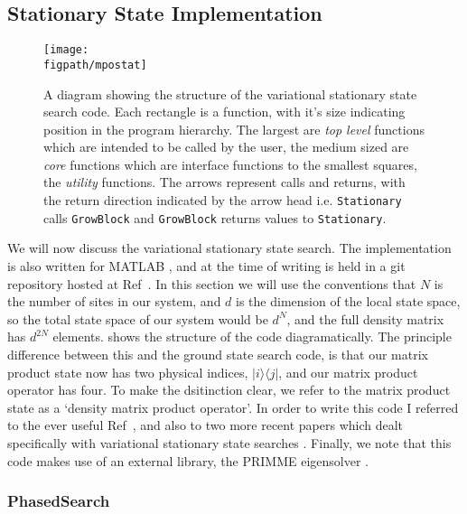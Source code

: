 \FloatBarrier 
 
 \subsection{Stationary State Implementation}
 
 \begin{figure}[ht!]
 \centering
 \texttt{[image: \\figpath/mpostat]}
 \caption{A diagram showing the structure of the variational stationary state search code. Each rectangle is a function, with it's size indicating position in the program hierarchy. The largest are \emph{top level} functions which are intended to be called by the user, the medium sized are \emph{core} functions which are interface functions to the smallest squares, the \emph{utility} functions. The arrows represent calls and returns, with the return direction indicated by the arrow head i.e. \lstinline$Stationary$ calls \lstinline$GrowBlock$ and \lstinline$GrowBlock$ returns values to \lstinline$Stationary$. }
 \label{fig:vs2-2}
 \end{figure} 
 
 We will now discuss the variational stationary state search. The implementation is also written for MATLAB \cite{MATLAB}, and at the time of writing is held in a git repository hosted at Ref~\cite{otb:gitVSSS}. In this section we will use the conventions that \(N\) is the number of sites in our system, and \(d\) is the dimension of the local state space, so the total state space of our system would be \(d^{N}\), and the full density matrix has \(d^{2N}\) elements.  shows the structure of the code diagramatically. The principle difference between this and the ground state search code, is that our matrix product state now has two physical indices, \(|i \rangle \langle j |\), and our matrix product operator has four. To make the dsitinction clear, we refer to the matrix product state as a `density matrix product operator'. In order to write this code I referred to the ever useful Ref~\cite{Schollwoeck11}, and also to two more recent papers which dealt specifically with variational stationary state searches \cite{CCB15,MFS15}. Finally, we note that this code makes use of an external library, the PRIMME eigensolver \cite{SM10,WRS16}.
 
 \subsubsection{PhasedSearch}
